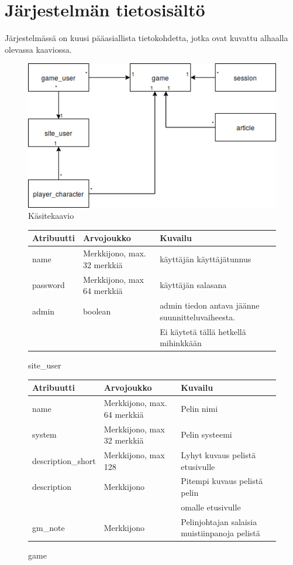 \documentclass[11pt]{article}
\begin{document}
\section{Järjestelmän tietosisältö}
Järjestelmässä on kuusi pääasiallista tietokohdetta, jotka ovat kuvattu alhaalla olevassa kaaviossa.
\begin{figure}[t]
\centering
\includegraphics[scale=0.5]{pictures/kasitekaavio.png}
\caption{Käsitekaavio}
\end{figure}

\begin{figure}[H]
\caption{site\_user}
\begin{tabular}{| l | l | l |}
\hline
Atribuutti & Arvojoukko & Kuvailu \\
\hline
name & Merkkijono, max. 32 merkkiä & käyttäjän käyttäjätunnus \\
\hline
password & Merkkijono, max 64 merkkiä & käyttäjän salasana \\
\hline 
admin & boolean & admin tiedon antava jäänne suunnitteluvaiheesta. \\
 & & Ei käytetä tällä hetkellä mihinkkään \\
\hline
\end{tabular}
\end{figure}

\begin{figure}[H]
\caption{game}
\begin{tabular}{| l | l | l |}
\hline
Atribuutti & Arvojoukko & Kuvailu \\
\hline
name & Merkkijono, max. 64 merkkiä & Pelin nimi \\
\hline
system & Merkkijono, max 32 merkkiä & Pelin systeemi \\
\hline
description\_short & Merkkijono, max 128 & Lyhyt kuvaus pelistä etusivulle \\
\hline 
description & Merkkijono & Pitempi kuvaus pelistä pelin \\
& & omalle etusivulle \\
\hline
gm\_note & Merkkijono & Pelinjohtajan salaisia muistiinpanoja pelistä \\
\hline
\end{tabular}
\end{figure}
\end{document}
